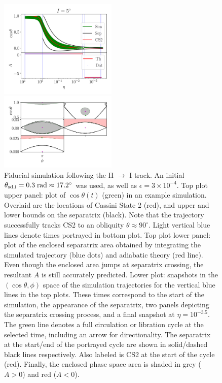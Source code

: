 \documentclass[
        fleqn,
        usenatbib,
    ]{mnras}
\newcommand*{\p}[1]{\left(#1\right)}
\begin{document}
\begin{figure}
    \centering
    \includegraphics[width=0.5\textwidth]{plots_diskdisp/3testo21.png}

    \includegraphics[width=0.5\textwidth]{plots_diskdisp/3testo21_subplots.png}
    \caption{Fiducial simulation following the II $\to$ I
    track. An initial $\theta_{\rm sd, i} = 0.3\;\mathrm{rad} \approx
    17.2^\circ$ was used, as well as $\epsilon = 3 \times 10^{-4}$. Top plot
    upper panel: plot of $\cos \theta(t)$ (green) in an example simulation.
    Overlaid are the locations of Cassini State 2 (red), and upper and lower
    bounds on the separatrix (black). Note that the trajectory successfully
    tracks CS2 to an obliquity $\theta \approx 90^\circ$. Light vertical blue
    lines denote times portrayed in bottom plot. Top plot lower panel: plot of
    the enclosed separatrix area obtained by integrating the simulated
    trajectory (blue dots) and adiabatic theory (red line). Even though the
    enclosed area jumps at separatrix crossing, the resultant $A$ is still
    accurately predicted. Lower plot: snapshots in the $\p{\cos \theta, \phi}$
    space of the simulation trajectories for the vertical blue lines in the top
    plots. These times correspond to the start of the simulation, the appearance
    of the separatrix, two panels depicting the separatrix crossing process, and
    a final snapshot at $\eta = 10^{-3.5}$. The green line denotes a full
    circulation or libration cycle at the selected time, including an arrow for
    directionality. The separatrix at the start/end of the portrayed cycle are
    shown in solid/dashed black lines respectively. Also labeled is CS2 at the
    start of the cycle (red). Finally, the enclosed phase space area is shaded
    in grey ($A > 0$) and red ($A < 0$).}\label{fig:ad_21}
\end{figure}
\end{document}
